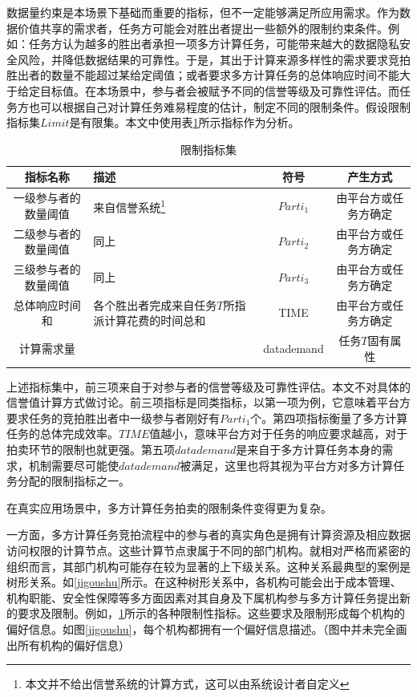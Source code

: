 \documentclass[promaster]{thesis-uestc}
\begin{document}
数据量约束是本场景下基础而重要的指标，但不一定能够满足所应用需求。作为数据价值共享的需求者，任务方可能会对胜出者提出一些额外的限制约束条件。例如：任务方认为越多的胜出者承担一项多方计算任务，可能带来越大的数据隐私安全风险，并降低数据结果的可靠性。于是，其出于计算来源多样性的需求要求竞拍胜出者的数量不能超过某给定阈值；或者要求多方计算任务的总体响应时间不能大于给定目标值。在本场景中，参与者会被赋予不同的信誉等级及可靠性评估。而任务方也可以根据自己对计算任务难易程度的估计，制定不同的限制条件。假设限制指标集$Limit$是有限集。本文中使用表\ref{zhibiao}所示指标作为分析。

\begin{table}[h]
\caption{限制指标集}
\label{zhibiao}
\begin{tabular}{cp{10em}cc}
    \toprule
    指标名称& 描述&符号&产生方式\\
    \midrule
    一级参与者的数量阈值&来自信誉系统\footnote{本文并不给出信誉系统的计算方式，这可以由系统设计者自定义}&$Parti_1$&由平台方或任务方确定\\
    二级参与者的数量阈值& 同上&$Parti_2$&由平台方或任务方确定\\
    三级参与者的数量阈值& 同上&$Parti_3$&由平台方或任务方确定\\
    总体响应时间和&各个胜出者完成来自任务$T$所指派计算花费的时间总和&TIME&由平台方或任务方确定\\
    计算需求量&&datademand&任务$T$固有属性\\
    \bottomrule
\end{tabular}
\end{table}

上述指标集中，前三项来自于对参与者的信誉等级及可靠性评估。本文不对具体的信誉值计算方式做讨论。前三项指标是同类指标，以第一项为例，它意味着平台方要求任务的竞拍胜出者中一级参与者刚好有$Parti_1$个。第四项指标衡量了多方计算任务的总体完成效率。$TIME$值越小，意味平台方对于任务的响应要求越高，对于拍卖环节的限制也就更强。第五项$datademand$是来自于多方计算任务本身的需求，机制需要尽可能使$datademand$被满足，这里也将其视为平台方对多方计算任务分配的限制指标之一。

在真实应用场景中，多方计算任务拍卖的限制条件变得更为复杂。

一方面，多方计算任务竞拍流程中的参与者的真实角色是拥有计算资源及相应数据访问权限的计算节点。这些计算节点隶属于不同的部门机构。就相对严格而紧密的组织而言，其部门机构可能存在较为显著的上下级关系。这种关系最典型的案例是树形关系。如\ref{jigoushu}所示。在这种树形关系中，各机构可能会出于成本管理、机构职能、安全性保障等多方面因素对其自身及下属机构参与多方计算任务提出新的要求及限制。例如，\ref{zhibiao}所示的各种限制性指标。这些要求及限制形成每个机构的偏好信息。如图\ref{jigoushu}，每个机构都拥有一个偏好信息描述。（图中并未完全画出所有机构的偏好信息）
\end{document}
